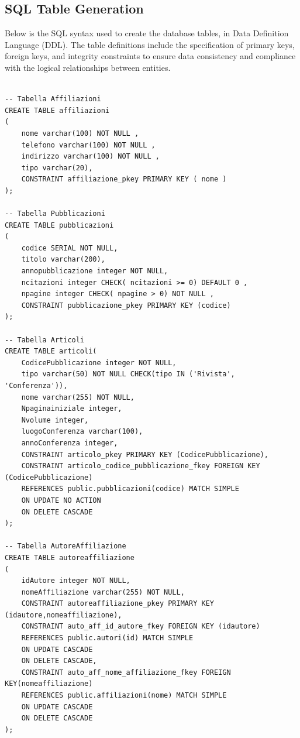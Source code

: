 \documentclass[a4paper,12pt]{article}
\begin{document}
\subsection{SQL Table Generation}
Below is the SQL syntax used to create the database tables, in Data Definition Language (DDL). The table definitions include the specification of primary keys, foreign keys, and integrity constraints to ensure data consistency and compliance with the logical relationships between entities.

\begin{lstlisting}

-- Tabella Affiliazioni
CREATE TABLE affiliazioni
(
    nome varchar(100) NOT NULL ,
    telefono varchar(100) NOT NULL ,
    indirizzo varchar(100) NOT NULL ,
    tipo varchar(20),
    CONSTRAINT affiliazione_pkey PRIMARY KEY ( nome )
);

-- Tabella Pubblicazioni
CREATE TABLE pubblicazioni
(
    codice SERIAL NOT NULL,
    titolo varchar(200),
    annopubblicazione integer NOT NULL,
    ncitazioni integer CHECK( ncitazioni >= 0) DEFAULT 0 ,
    npagine integer CHECK( npagine > 0) NOT NULL ,
    CONSTRAINT pubblicazione_pkey PRIMARY KEY (codice)
);

-- Tabella Articoli
CREATE TABLE articoli(
    CodicePubblicazione integer NOT NULL,
    tipo varchar(50) NOT NULL CHECK(tipo IN ('Rivista', 'Conferenza')),
    nome varchar(255) NOT NULL,
    Npaginainiziale integer,
    Nvolume integer,
    luogoConferenza varchar(100),
    annoConferenza integer,
    CONSTRAINT articolo_pkey PRIMARY KEY (CodicePubblicazione),
    CONSTRAINT articolo_codice_pubblicazione_fkey FOREIGN KEY (CodicePubblicazione)
    REFERENCES public.pubblicazioni(codice) MATCH SIMPLE
    ON UPDATE NO ACTION
    ON DELETE CASCADE
);

-- Tabella AutoreAffiliazione
CREATE TABLE autoreaffiliazione
(
    idAutore integer NOT NULL,
    nomeAffiliazione varchar(255) NOT NULL,
    CONSTRAINT autoreaffiliazione_pkey PRIMARY KEY (idautore,nomeaffiliazione),
    CONSTRAINT auto_aff_id_autore_fkey FOREIGN KEY (idautore)
    REFERENCES public.autori(id) MATCH SIMPLE
    ON UPDATE CASCADE
    ON DELETE CASCADE,
    CONSTRAINT auto_aff_nome_affiliazione_fkey FOREIGN KEY(nomeaffiliazione)
    REFERENCES public.affiliazioni(nome) MATCH SIMPLE
    ON UPDATE CASCADE
    ON DELETE CASCADE
);


\end{lstlisting}
\end{document}
